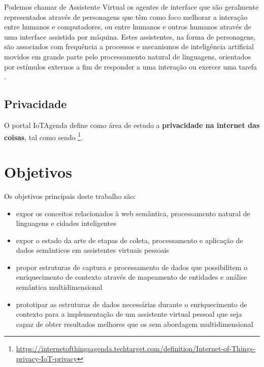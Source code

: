 Podemos chamar de Assistente Virtual os agentes de interface que são geralmente representados através de personagens que têm como foco melhorar a interação entre humanos e computadores, ou entre humanos e outros humanos através de uma interface assistida por máquina. Estes assistentes, na forma de personagens, são associados com frequência a processos e mecanismos de inteligência artificial movidos em grande parte pelo processamento natural de linguagens, orientados por estímulos externos a fim de responder a uma interação ou exercer uma tarefa \cite{reategui2006agentes}.

\subsection{Privacidade} \label{ss:privacidade_na_internet_das_coisas}

O portal IoTAgenda define como área de estudo a \textbf{privacidade na internet das coisas}, tal como sendo  \footnote{\url{https://internetofthingsagenda.techtarget.com/definition/Internet-of-Things-privacy-IoT-privacy}}.

\section{Objetivos} \label{s:objetivos}

Os objetivos principais deste trabalho são:

\begin{itemize}
    \item expor os conceitos relacionados à web semântica, processamento natural de linguagens e cidades inteligentes
    \item expor o estado da arte de etapas de coleta, processamento e aplicação de dados semânticos em assistentes virtuais pessoais
    \item propor estruturas de captura e processamento de dados que possibilitem o enriquecimento de contexto através de mapeamento de entidades e análise semântica multidimensional
    \item prototipar as estruturas de dados necessárias durante o enriquecimento de contexto para a implementação de um assistente virtual pessoal que seja capaz de obter resultados melhores que os sem abordagem multidimensional
\end{itemize}

